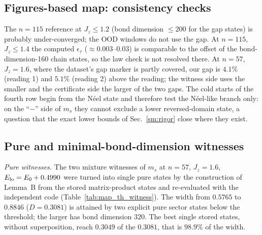 \documentclass[aps,prx,onecolumn,10pt,nofootinbib,longbibliography,floatfix]{revtex4-2}
\theoremstyle{remark}
\newcommand{\Jz}{J_z}
\newcommand{\ms}{m_s}
\begin{document}
\needspace{0.55\textheight} %
\subsection{Figures-based map: consistency checks}
\def\SMcap{Consistency checks of the figures-based map computation, all fixed before the run. Each row names the check and what it
covers, whether it passed, and the measured deviations (energies in units of the exchange coupling). The last row is a
record kept for comparison, not a pass condition; it is recomputed here from the stored record of the map.}\def\SMlab{tab:map_checks}


\noindent The $n=115$ reference at $\Jz\le1.2$ (bond dimension $\le200$ for the gap states) is probably %
under-converged; the OOD windows do not use the gap. At $n=115$, $\Jz\le1.4$ the computed $\epsilon_\tau$ %
($\approx0.003$--$0.03$) is comparable to the offset of the bond-dimension-160 chain states, so the law check is not %
resolved there. At $n=57$, $\Jz=1.6$, where the dataset's gap marker is partly covered, our gap is $4.1\%$ (reading 1) %
and $5.1\%$ (reading 2) above the reading; the witness side uses the smaller and the certificate side the larger of %
the two gaps. The cold starts of the fourth row begin from the N\'eel state and therefore test the N\'eel-like branch
only: on the ``$-$'' side of $\ms$ they cannot exclude a lower reversed-domain state, a question that the exact
lower bounds of Sec.~\ref{sm:rigor} close where they exist.

\subsection{Pure and minimal-bond-dimension witnesses}
\label{sm:pure}

\emph{Pure witnesses.} The two mixture witnesses of $\ms$ at $n=57$, $\Jz=1.6$, $E_{\rm lo}=E_0+0.4990$ were turned into %
single pure states by the construction of Lemma~B from the stored matrix-product states and re-evaluated with the
independent code (Table~\ref{tab:map_th_witness}). The width from $0.5765$ to $0.8846$ ($D=0.3081$) is attained by two explicit pure sector states %
below the threshold; the larger has bond dimension $320$. The best single stored states, without superposition, %
reach $0.3049$ of the $0.3081$, that is $98.9\%$ of the width. %
\end{document}
